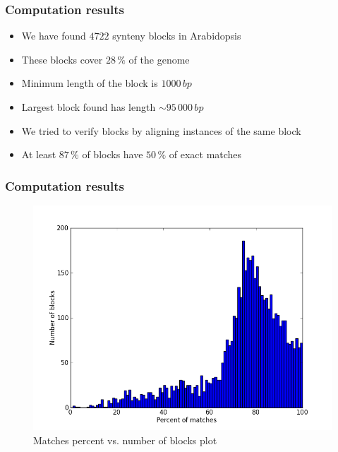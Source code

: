 \documentclass[svgnames,14pt]{beamer}
\begin{document}
\begin{frame}
\frametitle{Computation results}
\begin{itemize}
\item We have found \(4722\) synteny blocks in Arabidopsis
\item These blocks cover \(28 \, \%\) of the genome
\item Minimum length of the block is \(1000 \, bp\)
\item Largest block found has length \(\sim 95 \, 000 \, bp\)
\item We tried to verify blocks by aligning instances of the same block
\item At least \(87 \, \%\) of blocks have \(50 \, \%\) of exact matches
\end{itemize}
\end{frame}

\begin{frame}
\frametitle{Computation results}
\begin{figure}
\centering
\includegraphics[scale = 0.480]{blocks_alignments.png}
\small \caption{Matches percent vs. number of blocks plot}
\end{figure}
\end{frame}
\end{document}
